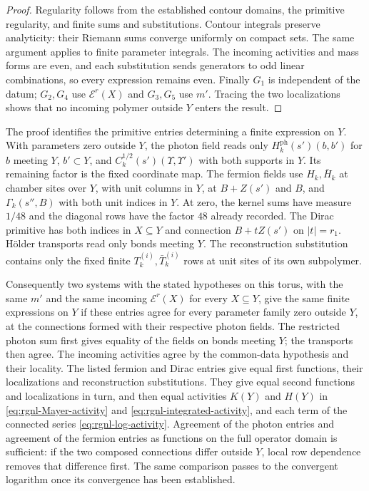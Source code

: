\begin{proof}
Regularity follows from the established contour domains,
the primitive regularity, and finite sums and substitutions.
Contour integrals preserve analyticity: their Riemann sums
converge uniformly on compact sets. The same argument
applies to finite parameter integrals. The incoming
activities and mass forms are even, and each substitution
sends generators to odd linear combinations, so every
expression remains even.
Finally $G_1$ is independent of the datum; $G_2,G_4$
use $\mathscr E^r(X)$ and $G_3,G_5$ use $m'$.
Tracing the two localizations shows that no incoming
polymer outside $Y$ enters the result.
\end{proof}

The proof identifies the primitive entries determining a
finite expression on $Y$. With parameters zero outside $Y$,
the photon field reads only
$H_k^{\mathrm{ph}}(s')(b,b')$ for $b$ meeting $Y$,
$b'\subset Y$, and
$C_k^{1/2}(s')(\Upsilon,\Upsilon')$ with both supports
in $Y$. Its remaining factor is the fixed coordinate map.
The fermion fields use $H_k,\bar H_k$ at chamber sites
over $Y$, with unit columns in $Y$, at $B+Z(s')$ and
$B$, and $\Gamma_k(s'',B)$ with both unit indices in $Y$.
At zero, the kernel sums have measure $1/48$ and the
diagonal rows have the factor $48$ already recorded.
The Dirac primitive has both indices in $X\subseteq Y$
and connection $B+tZ(s')$ on $|t|=r_1$.
H\"older transports read only bonds meeting $Y$.
The reconstruction substitution contains only the fixed
finite $T_k^{(i)},\bar T_k^{(i)}$ rows at unit sites of its
own subpolymer.

Consequently two systems with the stated hypotheses on this torus,
with the same $m'$ and the same incoming $\mathscr E^r(X)$
for every $X\subseteq Y$, give the same finite expressions on $Y$
if these entries agree
for every parameter family zero outside $Y$, at the
connections formed with their respective photon fields.
The restricted photon sum first gives equality of the
fields on bonds meeting $Y$; the transports then agree. The
incoming activities agree by the common-data hypothesis and
their locality.
The listed fermion and Dirac entries give equal first
functions, their localizations and reconstruction
substitutions. They give equal second functions and
localizations in turn, and then equal activities $K(Y)$ and
$H(Y)$ in \eqref{eq:rgnl-Mayer-activity} and
\eqref{eq:rgnl-integrated-activity}, and each term of the
connected series \eqref{eq:rgnl-log-activity}.
Agreement of the photon
entries and agreement of the fermion entries as functions
on the full operator domain is sufficient: if the two
composed connections differ outside $Y$, local row
dependence removes that difference first.
The same comparison passes to the convergent logarithm
once its convergence has been established.

